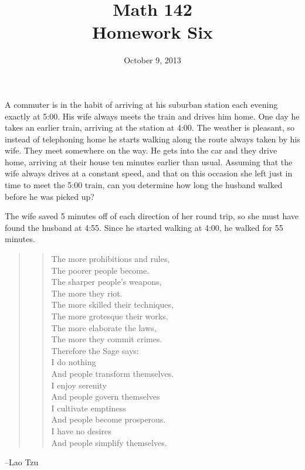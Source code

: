\documentclass{exam}
\author{}
\date{October 9, 2013}
\title{Math 142 \\ Homework Six}
\begin{document}
  \maketitle

  A commuter is in the habit of arriving at his suburban station each evening exactly at 5:00.  His wife always meets
  the train and drives him home.  One day he takes an earlier train, arriving at the station at 4:00.  The weather is
  pleasant, so instead of telephoning home he starts walking along the route always taken by his wife.  They meet
  somewhere on the way.  He gets into the car and they drive home, arriving at their house ten minutes earlier than
  usual.  Assuming that the wife always drives at a constant speed, and that on this occasion she left just in time to
  meet the 5:00 train, can you determine how long the husband walked before he was picked up?

  \begin{solution}
    The wife saved 5 minutes off of each direction of her round trip, so she must have found the husband at 4:55.
    Since he started walking at 4:00, he walked for 55 minutes.
  \end{solution}

  \ifprintanswers
    \vspace{2 cm}
  \else
    \vspace{4 cm}
  \fi

  \begin{quote}
    \begin{em}
      \begin{verse}
        The more prohibitions and rules, \\
        The poorer people become. \\
        The sharper people's weapons, \\
        The more they riot. \\
        The more skilled their techniques, \\
        The more grotesque their works. \\
        The more elaborate the laws, \\
        The more they commit crimes. \\
        \vspace{.2 cm}
        Therefore the Sage says: \\
        \vspace{.2 cm}
        I do nothing \\
        And people transform themselves. \\
        I enjoy serenity \\
        And people govern themselves \\
        I cultivate emptiness \\
        And people become prosperous. \\
        I have no desires \\
        And people simplify themselves. \\
      \end{verse}

    \end{em}
  \end{quote}
  \hspace{2 cm} --Lao Tzu
\end{document}
